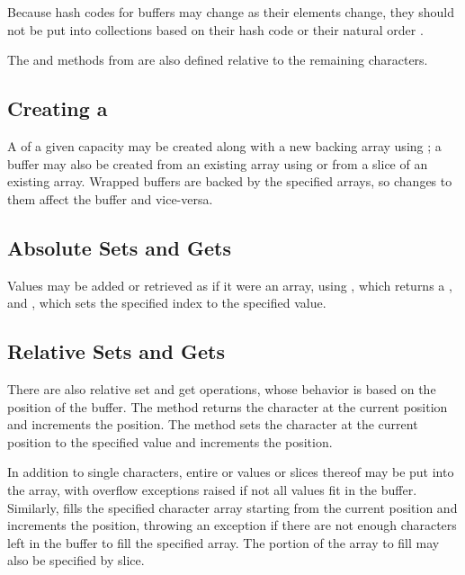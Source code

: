 Because hash codes for buffers may change as their elements change,
they should not be put into collections based on their hash code
 or their natural order
.

The  and  methods from 
are also defined relative to the remaining characters.


\subsection{Creating a }

A  of a given capacity may be created along with
a new backing array using
; a buffer may also be created from
an existing array using  or from a slice
of an existing array.  Wrapped buffers are backed by the specified
arrays, so changes to them affect the buffer and vice-versa.

\subsection{Absolute Sets and Gets}

Values may be added or retrieved as if it were an array, using
, which returns a
, and , which sets the specified index
to the specified  value.

\subsection{Relative Sets and Gets}

There are also relative set and get operations, whose behavior is
based on the position of the buffer.  The  method returns
the character at the current position and increments the position.
The  method sets the character at the current position
to the specified value and increments the position.  

In addition to single characters, entire  or
 values or slices thereof may be put into the array, with
overflow exceptions raised if not all values fit in the buffer.
Similarly,  fills the specified character array
starting from the current position and increments the position,
throwing an exception if there are not enough characters left in the
buffer to fill the specified array.  The portion of the array to fill
may also be specified by slice.


